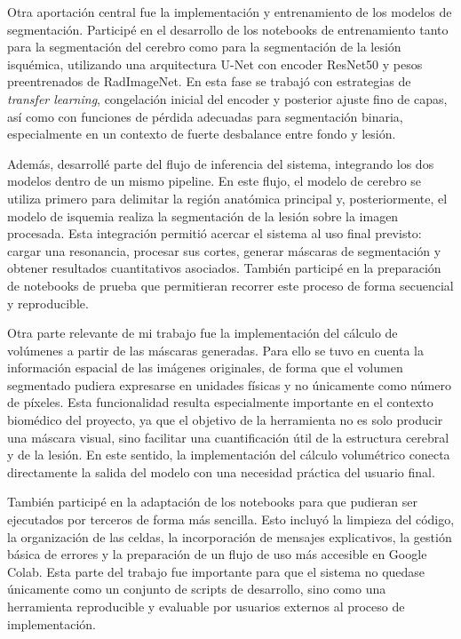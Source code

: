 Otra aportación central fue la implementación y entrenamiento de los modelos de segmentación. Participé en el desarrollo de los notebooks de entrenamiento tanto para la segmentación del cerebro como para la segmentación de la lesión isquémica, utilizando una arquitectura U-Net con encoder ResNet50 y pesos preentrenados de RadImageNet. En esta fase se trabajó con estrategias de \textit{transfer learning}, congelación inicial del encoder y posterior ajuste fino de capas, así como con funciones de pérdida adecuadas para segmentación binaria, especialmente en un contexto de fuerte desbalance entre fondo y lesión.

Además, desarrollé parte del flujo de inferencia del sistema, integrando los dos modelos dentro de un mismo pipeline. En este flujo, el modelo de cerebro se utiliza primero para delimitar la región anatómica principal y, posteriormente, el modelo de isquemia realiza la segmentación de la lesión sobre la imagen procesada. Esta integración permitió acercar el sistema al uso final previsto: cargar una resonancia, procesar sus cortes, generar máscaras de segmentación y obtener resultados cuantitativos asociados. También participé en la preparación de notebooks de prueba que permitieran recorrer este proceso de forma secuencial y reproducible.

Otra parte relevante de mi trabajo fue la implementación del cálculo de volúmenes a partir de las máscaras generadas. Para ello se tuvo en cuenta la información espacial de las imágenes originales, de forma que el volumen segmentado pudiera expresarse en unidades físicas y no únicamente como número de píxeles. Esta funcionalidad resulta especialmente importante en el contexto biomédico del proyecto, ya que el objetivo de la herramienta no es solo producir una máscara visual, sino facilitar una cuantificación útil de la estructura cerebral y de la lesión. En este sentido, la implementación del cálculo volumétrico conecta directamente la salida del modelo con una necesidad práctica del usuario final.

También participé en la adaptación de los notebooks para que pudieran ser ejecutados por terceros de forma más sencilla. Esto incluyó la limpieza del código, la organización de las celdas, la incorporación de mensajes explicativos, la gestión básica de errores y la preparación de un flujo de uso más accesible en Google Colab. Esta parte del trabajo fue importante para que el sistema no quedase únicamente como un conjunto de scripts de desarrollo, sino como una herramienta reproducible y evaluable por usuarios externos al proceso de implementación.

